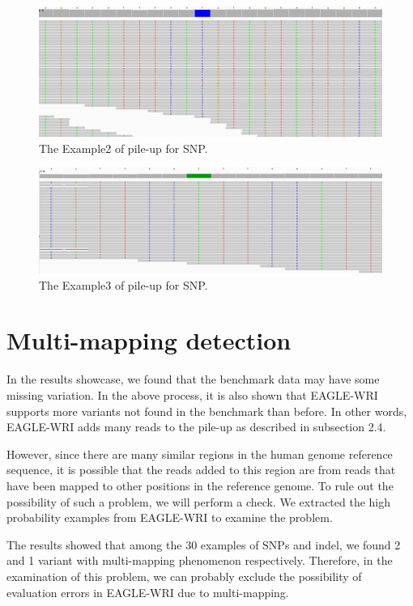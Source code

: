 \documentclass[PhD]{PHlab-thesis}
\begin{document}
\begin{figure}[h!]
	\centering
	\includegraphics[scale=0.25]{figures/SNP2.png}
	\caption{The Example2 of pile-up for SNP.}
	\label{fig:The Example of pile-up for SNP2} %
\end{figure}

\begin{figure}[h!]
	\centering
	\includegraphics[scale=0.25]{figures/SNP1.png}
	\caption{The Example3 of pile-up for SNP.}
	\label{fig:The Example of pile-up for SNP3} %
\end{figure}


\section{Multi-mapping detection}
In the results showcase, we found that the benchmark data may have some missing variation. In the above process, it is also shown that EAGLE-WRI supports more variants not found in the benchmark than before. In other words, EAGLE-WRI adds many reads to the pile-up as described in subsection 2.4.

However, since there are many similar regions in the human genome reference sequence, it is possible that the reads added to this region are from reads that have been mapped to other positions in the reference genome. To rule out the possibility of such a problem, we will perform a check. We extracted the high probability examples from EAGLE-WRI to examine the problem. 

The results showed that among the 30 examples of SNPs and indel, we found 2 and 1 variant with multi-mapping phenomenon respectively. Therefore, in the examination of this problem, we can probably exclude the possibility of evaluation errors in EAGLE-WRI due to multi-mapping.
\end{document}
